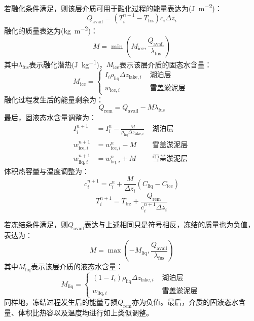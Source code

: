 若融化条件满足，则该层介质可用于融化过程的能量表达为(\unit{J.m^{-2}})：
\begin{equation}
  Q_{\mathrm{avail}}=\left(T_{i}^{n+1}-T_{\mathrm {frz}}\right) c_{i} \Delta z_{i}
\end{equation}
融化的质量表达为(\unit{kg.m^{-2}})：
\begin{equation}
  M=\min \left(M_{\mathrm{ice}}, \frac{Q_{\mathrm{a v a i l}}}{\lambda_{\mathrm {fus}}}\right)
\end{equation}
其中$\lambda_{\mathrm {fus}} $表示融化潜热(\unit{J.kg^{-1}})，$M_{\mathrm{ice}}$表示该层介质的固态水含量：
\begin{equation}
  M_{\mathrm{ice}}=\left\{\begin{array}{lr}I_{i} \rho_{\mathrm{liq}} \Delta z_{\mathrm{lake},i} &
  \text { 湖泊层 } \\ w_{\mathrm{ice},i} & \text { 雪盖淤泥层 }\end{array}\right.
\end{equation}
融化过程发生后的能量剩余为：
\begin{equation}
  Q_{\mathrm{rem}}=Q_{\mathrm{avail}}-M \lambda_{\mathrm {fus}}
\end{equation}
最后，固液态水含量调整为：
\begin{equation}
  \begin{aligned}
    I_{i}^{n+1} &=I_{i}^{n}-\frac{M}{\rho_{\mathrm{liq}} \Delta z_{\mathrm{lake},i}} & \text { 湖泊层 } \\
    w_{\mathrm{ice},i}^{n+1} &=w_{\mathrm{ice},i}^{n}-M & \text { 雪盖淤泥层 } \\
    w_{\mathrm{liq},i}^{n+1} &=w_{\mathrm{liq},i}^{n}+M & \text { 雪盖淤泥层 }
  \end{aligned}
\end{equation}
体积热容量与温度调整为：
\begin{equation}
  c_{i}^{n+1}=c_{i}^{n}+\frac{M}{\Delta z_{i}}\left(C_{\mathrm{liq}}-C_{\mathrm{ice}}\right)
\end{equation}
\begin{equation}
  T_{i}^{n+1}=T_{\mathrm {frz}}+\frac{Q_{\mathrm{rem}}}{c_{i}^{n+1} \Delta z_{i}}
\end{equation}

若冻结条件满足，则$Q_{\mathrm{avail}}$表达与上述相同只是符号相反，冻结的质量也为负值，表达为：
\begin{equation}
  M=\max \left(-M_{\mathrm{liq}}, \frac{Q_{\mathrm{avail}}}{\lambda_{\mathrm {fus}}}\right)
\end{equation}
其中$M_{\mathrm{liq}}$表示该层介质的液态水含量：
\begin{equation}
  M_{\mathrm{liq}}=\left\{\begin{array}{cc}\left(1-I_{i}\right) \rho_{\mathrm{liq}} \Delta z_{\mathrm{lake},i} & \text { 湖泊层 } \\
  w_{\mathrm{liq},i} & \text { 雪盖淤泥层 }\end{array}\right.
\end{equation}
同样地，冻结过程发生后的能量亏损$Q_{\mathrm{rem}}$亦为负值。最后，介质的固液态水含量、体积比热容以及温度均进行如上类似调整。


